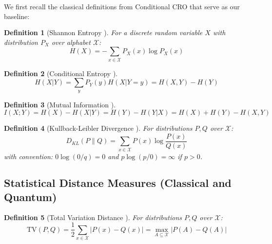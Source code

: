 \documentclass{ieeeaccess}
\newtheorem{definition}{Definition}[section]
\begin{document}
We first recall the classical definitions from Conditional CRO that serve as our baseline:

\begin{definition}[Shannon Entropy {\cite[Definition II-A.1]{Minka2026CRO}}]
For a discrete random variable $X$ with distribution $P_X$ over alphabet $\mathcal{X}$:
\begin{equation}
    H(X) = -\sum_{x \in \mathcal{X}} P_X(x) \log P_X(x)
\end{equation}
\end{definition}

\begin{definition}[Conditional Entropy {\cite[Definition II-A.2]{Minka2026CRO}}]
\begin{equation}
    H(X|Y) = \sum_{y} P_Y(y) H(X|Y=y) = H(X,Y) - H(Y)
\end{equation}
\end{definition}

\begin{definition}[Mutual Information {\cite[Definition II-A.3]{Minka2026CRO}}]
\begin{equation}
    I(X; Y) = H(X) - H(X|Y) = H(Y) - H(Y|X) = H(X) + H(Y) - H(X,Y)
\end{equation}
\end{definition}

\begin{definition}[Kullback-Leibler Divergence {\cite[Definition II-A.4]{Minka2026CRO}}]
For distributions $P, Q$ over $\mathcal{X}$:
\begin{equation}
    D_{KL}(P\|Q) = \sum_{x \in \mathcal{X}} P(x) \log \frac{P(x)}{Q(x)}
\end{equation}
with convention: $0 \log(0/q) = 0$ and $p \log(p/0) = \infty$ if $p > 0$.
\end{definition}

\subsection{Statistical Distance Measures (Classical and Quantum)}

\begin{definition}[Total Variation Distance {\cite[Definition II-B.1]{Minka2026CRO}}]
For distributions $P, Q$ over $\mathcal{X}$:
\begin{equation}
    \text{TV}(P, Q) = \frac{1}{2}\sum_{x \in \mathcal{X}} |P(x) - Q(x)| = \max_{A \subseteq \mathcal{X}} |P(A) - Q(A)|
\end{equation}
\end{definition}
\end{document}
